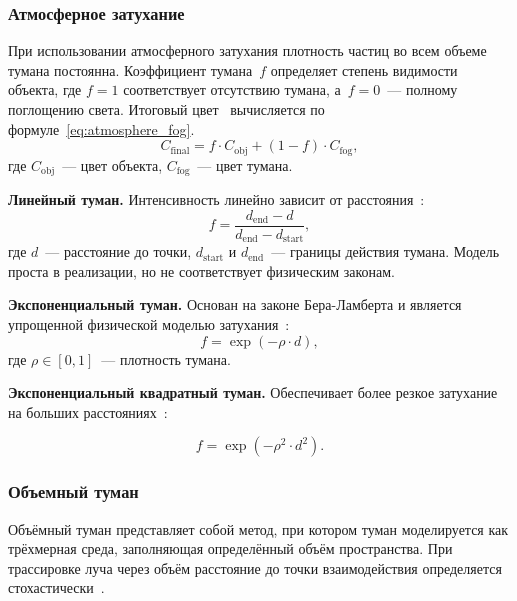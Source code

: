 \subsubsection{Атмосферное затухание}

При использовании атмосферного затухания плотность частиц во всем объеме тумана постоянна.
Коэффициент тумана~$f$ определяет степень видимости объекта, где $f = 1$ соответствует отсутствию тумана, а~$f = 0$~--- полному поглощению света.
Итоговый цвет~\cite{fog-article} вычисляется по формуле~\ref{eq:atmosphere_fog}.
\begin{equation}
    \label{eq:atmosphere_fog}
    C_{\text{final}} = f \cdot C_{\text{obj}} + (1 - f) \cdot C_{\text{fog}},    
\end{equation}
где $C_{\text{obj}}$~--- цвет объекта, $C_{\text{fog}}$~--- цвет тумана.

\textbf{Линейный туман.} Интенсивность линейно зависит от расстояния~\cite{fog-opengl}:
\begin{equation}
    \label{eq:linear_fog}
    f = \frac{d_{\text{end}} - d}{d_{\text{end}} - d_{\text{start}}},    
\end{equation}
\noindent где $d$~--- расстояние до точки, $d_{\text{start}}$ и $d_{\text{end}}$~--- границы действия тумана.
Модель проста в реализации, но не соответствует физическим законам.

\textbf{Экспоненциальный туман.} Основан на законе Бера-Ламберта и является упрощенной физической моделью затухания~\cite{fog-article}:
\begin{equation}
    \label{eq:exponent}
    f = \exp(-\rho \cdot d),    
\end{equation}
\noindent где $\rho \in [0, 1]$~--- плотность тумана.

\textbf{Экспоненциальный квадратный туман.} Обеспечивает более резкое затухание на больших расстояниях~\cite{fog-article}:

\begin{equation}
    \label{eq:exponent_square}
    f = \exp(-\rho^2 \cdot d^2).
\end{equation}

\subsubsection{Объемный туман}

Объёмный туман представляет собой метод, при котором туман моделируется как трёхмерная среда,
заполняющая определённый объём пространства.
При трассировке луча через объём расстояние до точки взаимодействия определяется стохастически~\cite{exp-distribution}.

